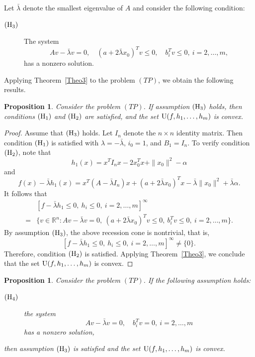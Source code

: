 \documentclass[]{interact}
\theoremstyle{plain}%
\newtheorem{proposition}[theorem]{Proposition}
\theoremstyle{definition}
\theoremstyle{remark}
\begin{document}
	Let $\bar\lambda$ denote the smallest eigenvalue of $A$ and consider the following condition:
	\begin{description}
		\item[${\rm (H_3)}$]
		The system
		\[
		Av-\bar\lambda v=0,\quad
		(a+2\bar\lambda x_0)^Tv\leq 0,\quad
		b_i^Tv\leq 0,\ i=2,\ldots,m,
		\]
		has a nonzero solution.
	\end{description}
	Applying Theorem~\ref{Theo3} to the problem $(TP)$, we obtain the following results.
	\begin{proposition}\label{Theo4}
		Consider the problem $(TP)$.
		If assumption ${\rm (H_3)}$ holds, then conditions ${\rm (H_1)}$ and ${\rm (H_2)}$
		are satisfied, and the set ${\rm U}(f,h_1,\ldots,h_m)$ is convex.
	\end{proposition}
	
	\begin{proof}
		Assume that ${\rm (H_3)}$ holds.
		Let $I_n$ denote the $n\times n$ identity matrix.
		Then condition ${\rm (H_1)}$ is satisfied with $\lambda=-\bar\lambda$,
		$i_0=1$, and $B_1=I_n$.
		To verify condition ${\rm (H_2)}$, note that
		$$h_1(x)=x^TI_nx-2x_0^Tx+\|x_0\|^2-\alpha$$
		and
		$$f(x)-\bar\lambda h_1(x)
		=x^T(A-\bar\lambda I_n)x+(a+2\bar\lambda x_0)^Tx
		-\bar\lambda\|x_0\|^2+\bar\lambda\alpha.$$
		It follows that
		\begin{align*}
			&[f-\bar\lambda h_1\leq 0,\ h_i\leq 0,\ i=2,\ldots,m]^\infty \\
			=&\{v\in \mathbb{R}^n :
			Av-\bar\lambda v=0,\ (a+2\bar\lambda x_0)^Tv\leq 0,\
			b_i^Tv\leq 0,\ i=2,\ldots,m\}.
		\end{align*}
		By assumption ${\rm (H_3)}$, the above recession cone is nontrivial, that is,
		$$
		[f-\bar\lambda h_1\leq 0,\ h_i\leq 0,\ i=2,\ldots,m]^\infty \neq \{0\}.
		$$
		Therefore, condition ${\rm (H_2)}$ is satisfied.
		Applying Theorem~\ref{Theo3}, we conclude that the set
		${\rm U}(f,h_1,\ldots,h_m)$ is convex.
	\end{proof}
	
	
	\begin{proposition}\label{Theo6} 
		Consider the problem $(TP)$.
		If the following assumption holds:
		\begin{description}
			\item[${\rm (H_4)}$]
			the system
			\[
			Av-\bar\lambda v=0,\quad b_i^Tv=0,\ i=2,\ldots,m
			\]
			has a nonzero solution,
		\end{description}
		then assumption ${\rm (H_3)}$ is satisfied and the set
		${\rm U}(f,h_1,\ldots,h_m)$ is convex.        
	\end{proposition}
	
\end{document}
